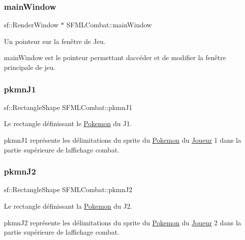 \subsubsection{\texorpdfstring{main\+Window}{mainWindow}}
{\footnotesize\ttfamily sf\+::\+Render\+Window $\ast$ S\+F\+M\+L\+Combat\+::main\+Window\hspace{0.3cm}{\ttfamily [private]}}



Un pointeur sur la fenêtre de Jeu. 

main\+Window est le pointeur permettant d\textquotesingle{}accéder et de modifier la fenêtre principale de jeu. \mbox{\label{class_s_f_m_l_combat_aced33a85a7133efb947d8c472f770ec1}} 
\subsubsection{\texorpdfstring{pkmn\+J1}{pkmnJ1}}
{\footnotesize\ttfamily sf\+::\+Rectangle\+Shape S\+F\+M\+L\+Combat\+::pkmn\+J1\hspace{0.3cm}{\ttfamily [private]}}



Le rectangle définissant le \hyperlink{class_pokemon}{Pokemon} du J1. 

pkmn\+J1 représente les délimitations du sprite du \hyperlink{class_pokemon}{Pokemon} du \hyperlink{class_joueur}{Joueur} 1 dans la partie supérieure de l\textquotesingle{}affichage combat. \mbox{\label{class_s_f_m_l_combat_ac85b298cc8a29f2ea61b5d1e76a4f427}} 
\subsubsection{\texorpdfstring{pkmn\+J2}{pkmnJ2}}
{\footnotesize\ttfamily sf\+::\+Rectangle\+Shape S\+F\+M\+L\+Combat\+::pkmn\+J2\hspace{0.3cm}{\ttfamily [private]}}



Le rectangle définissant la \hyperlink{class_pokemon}{Pokemon} du J2. 

pkmn\+J2 représente les délimitations du sprite du \hyperlink{class_pokemon}{Pokemon} du \hyperlink{class_joueur}{Joueur} 2 dans la partie supérieure de l\textquotesingle{}affichage combat. \mbox{\label{class_s_f_m_l_combat_a21d930da921cc2aa1cdc55b417c2fe0b}} 
